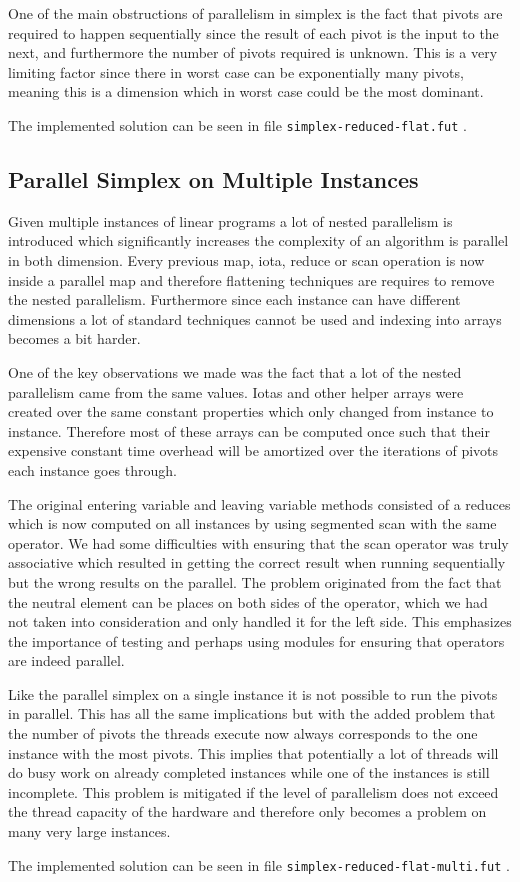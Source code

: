 One of the main obstructions of parallelism in simplex is the fact that pivots are required to happen sequentially since the result of each pivot is the input to the next, and furthermore the number of pivots required is unknown. This is a very limiting factor since there in worst case can be exponentially many pivots, meaning this is a dimension which in worst case could be the most dominant.

The implemented solution can be seen in file \texttt{simplex-reduced-flat.fut} .

\subsection{Parallel Simplex on Multiple Instances}
Given multiple instances of linear programs a lot of nested parallelism is introduced which significantly increases the complexity of an algorithm is parallel in both dimension. Every previous map, iota, reduce or scan operation is now inside a parallel map and therefore flattening techniques are requires to remove the nested parallelism. Furthermore since each instance can have different dimensions a lot of standard techniques cannot be used and indexing into arrays becomes a bit harder.

One of the key observations we made was the fact that a lot of the nested parallelism came from the same values. Iotas and other helper arrays were created over the same constant properties which only changed from instance to instance. Therefore most of these arrays can be computed once such that their expensive constant time overhead will be amortized over the iterations of pivots each instance goes through.

The original entering variable and leaving variable methods consisted of a reduces which is now computed on all instances by using segmented scan with the same operator. We had some difficulties with ensuring that the scan operator was truly associative which resulted in getting the correct result when running sequentially but the wrong results on the parallel. The problem originated from the fact that the neutral element can be places on both sides of the operator, which we had not taken into consideration and only handled it for the left side. This emphasizes the importance of testing and perhaps using modules for ensuring that operators are indeed parallel.

Like the parallel simplex on a single instance it is not possible to run the pivots in parallel. This has all the same implications but with the added problem that the number of pivots the threads execute now always corresponds to the one instance with the most pivots. This implies that potentially a lot of threads will do busy work on already completed instances while one of the instances is still incomplete. This problem is mitigated if the level of parallelism does not exceed the thread capacity of the hardware and therefore only becomes a problem on many very large instances.

The implemented solution can be seen in file \texttt{simplex-reduced-flat-multi.fut} .